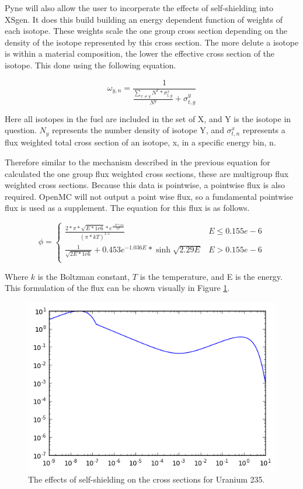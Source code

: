 \documentclass{article}
\begin{document}
Pyne will also allow the user to incorperate the effects of self-shielding into XSgen. It does this build building an energy dependent function of weights of each isotope. These weights scale the one group cross section depending on the density of the isotope represented by this cross section. The more delute a isotope is within a material composition, the lower the effective cross section of the isotope. This done using the following equation.

$$\omega_{y,n}=\frac{1}{\frac{\sum_{x\neq y}N^x * \sigma_{t,g}^x}{N^y}+\sigma_{t,g}^y}$$

Here all isotopes in the fuel are included in the set of X, and Y is the isotope in question. $N_y$ represents the number density of isotope Y, and $\sigma_{t,n}^x$ represents a flux weighted total cross section of an isotope, x, in a specific energy bin, n.

Therefore similar to the mechanism described in the previous equation for calculated the one group flux weighted cross sections, these are multigroup flux weighted cross sections. Because this data is pointwise, a pointwise flux is also required. OpenMC will not output a point wise flux, so a fundamental pointwise flux is used as a supplement. The equation for this flux is as follows.

\large

\[ \phi = \begin{cases}
      \frac{2*\pi*\sqrt{E*1e6}*e^{\frac{-E*1e6}{kT}}}{(\pi*kT)^1.5} & E\leq 0.155e-6 \\
      \frac{1}{\sqrt{2E*1e6}} + 0.453e^{-1.036E}*\sinh{\sqrt{2.29E}} & E > 0.155e-6 \\
   \end{cases}
\]

Where $k$ is the Boltzman constant, $T$ is the temperature, and E is the energy. This formulation of the flux can be shown visually in Figure \ref{fig:therm}.
\begin{figure}[h]
  \center
  \includegraphics[scale=0.8]{thermspec.png}
  \caption{The effects of self-shielding on the cross sections for Uranium 235.}
  \label{fig:therm}
\end{figure}
\end{document}

